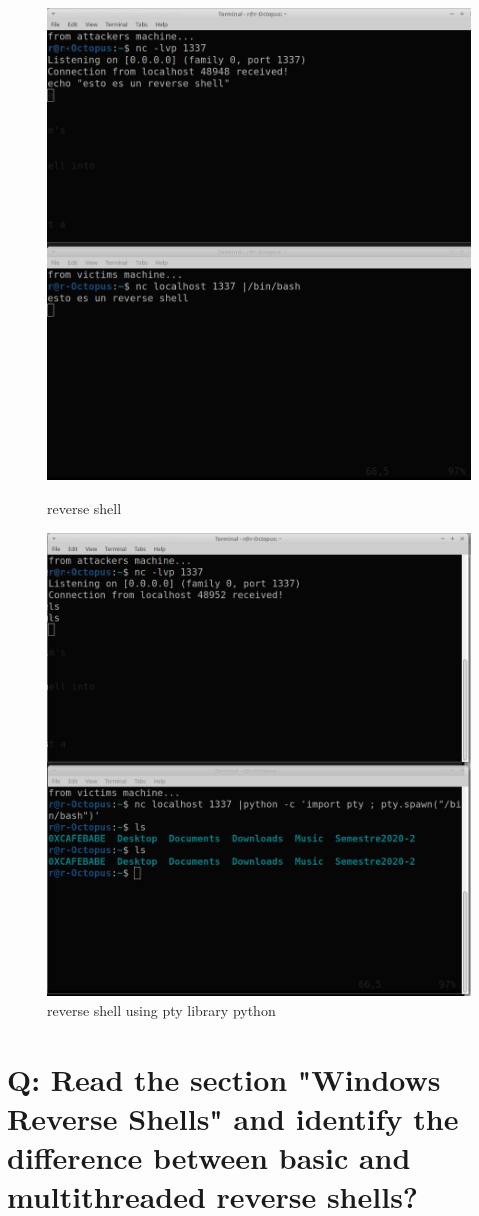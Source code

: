 \documentclass[10pt,a4paper]{article} %
\begin{document}
        \begin{figure}[h!]
            \centering
            \includegraphics[width=0.6\linewidth]{reverse.png}
            \caption{reverse shell}
            \includegraphics[width=0.6\linewidth]{global_reverse_shell.png}
            \caption{reverse shell using pty library python}
            \label{fig}
        \end{figure}

    \section{Q: Read the section "Windows Reverse Shells" and identify the
    difference between basic and multithreaded reverse shells?}

\end{document}
